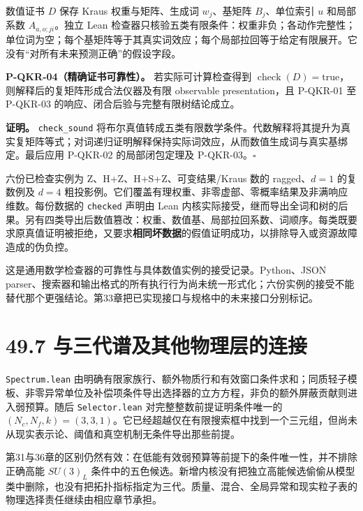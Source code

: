 \documentclass[
  11pt,
  oneside]{book}
\begin{document}
数值证书 \(D\) 保存 Kraus 权重与矩阵、生成词 \(w_j\)、基矩阵
\(B_j\)、单位索引 \(u\) 和局部系数 \(A_{a,o;ji}\)。独立 Lean
检查器只核验五类有限条件：权重非负；各动作完整性；单位词为空；每个基矩阵等于其真实词效应；每个局部拉回等于给定有限展开。它没有``对所有未来预测正确''的假设字段。

\protect\hypertarget{p-qkr-04}{}{}

\textbf{P-QKR-04（精确证书可靠性）。} 若实际可计算检查得到
\(\operatorname{check}(D)=\mathrm{true}\)，则解释后的复矩阵形成合法仪器及有限
observable presentation，且 P-QKR-01 至 P-QKR-03
的响应、闭合后验与完整有限树结论成立。

\textbf{证明。} \texttt{check\_\allowbreak sound}
将布尔真值转成五类有限数学条件。代数解释将其提升为真实复矩阵等式；对词递归证明解释保持实际词效应，从而数值生成词与真实基绑定。最后应用
P-QKR-02 的局部闭包定理及 P-QKR-03。\(\square\)

六份已检查实例为 Z、H+Z、H+S+Z、可变结果/Kraus 数的 ragged、\(d=1\)
的复数例及 \(d=4\)
粗投影例。它们覆盖有理权重、非零虚部、零概率结果及非满响应维数。每份数据的
\texttt{checked} 声明由 Lean
内核实际接受，继而导出全词和树的后果。另有四类导出后数值篡改：权重、数值基、局部拉回系数、词顺序。每类既要求原真值证明被拒绝，又要求\textbf{相同坏数据}的假值证明成功，以排除导入或资源故障造成的伪负控。

这是通用数学检查器的可靠性与具体数值实例的接受记录。Python、JSON
parser、搜索器和输出格式的所有执行行为尚未统一形式化；六份实例的接受不能替代那个更强结论。第33章把已实现接口与规格中的未来接口分别标记。

\hypertarget{ux4e0eux4e09ux4ee3ux8c31ux53caux5176ux4ed6ux7269ux7406ux5c42ux7684ux8fdeux63a5}{%
\section{49.7
与三代谱及其他物理层的连接}\label{ux4e0eux4e09ux4ee3ux8c31ux53caux5176ux4ed6ux7269ux7406ux5c42ux7684ux8fdeux63a5}}

\texttt{Spectrum.lean}
由明确有限家族行、额外物质行和有效窗口条件求和；同质轻子模板、非零异常单位及补偿项条件导出选择器的立方方程，非负的额外屏蔽贡献则进入弱预算。随后
\texttt{Selector.lean} 对完整整数前提证明条件唯一的
\((N_c,N_f,k)=(3,3,1)\)。它已经超越仅在有限搜索框中找到一个三元组，但尚未从现实表示论、阈值和真空机制无条件导出那些前提。

第31与36章的区别仍然有效：在低能有效弱预算等前提下的条件唯一性，并不排除正确高能
\(SU(3)_L\)
条件中的五色候选。新增内核没有把独立高能候选偷偷从模型类中删除，也没有把拓扑指标指定为三代。质量、混合、全局异常和现实粒子表的物理选择责任继续由相应章节承担。
\end{document}
